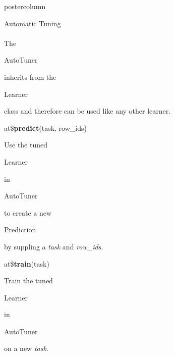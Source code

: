 \documentclass{beamer}
\newcommand{\codeinline}[1]{\begin{codeboxinline}#1\end{codeboxinline}}
\begin{document}
\begin{frame}[fragile]{}
\begin{columns}
\begin{column}{.245\textwidth}
\begin{beamercolorbox}[center]{postercolumn}
\begin{minipage}{.98\textwidth}
{\begin{myblock}{Automatic Tuning}
						\\
						\\
						The \codeinline{AutoTuner} inherits from the \codeinline{Learner} class and therefore can be used like any other learner.
						\\
						\begin{codebox}
							at\$\textbf{predict}(task, row\_ids)
						\end{codebox}
						Use the tuned \codeinline{Learner} in \codeinline{AutoTuner} to create a new \codeinline{Prediction} by suppling a \textit{task} and \textit{row\_ids}.
						\\
						\begin{codebox}
							at\$\textbf{train}(task)
						\end{codebox}
						Train the tuned \codeinline{Learner} in \codeinline{AutoTuner} on a new \textit{task}.
						\end{myblock}
					\vfill}
				\end{minipage}
			\end{beamercolorbox}
		\end{column}
	\end{columns}
\end{frame}
\end{document}
